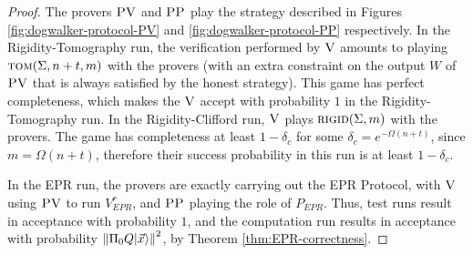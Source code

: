 \begin{proof}
The provers $\textsc{PV}$ and $\textsc{PP}$ play the strategy described in Figures
  \ref{fig:dogwalker-protocol-PV} and \ref{fig:dogwalker-protocol-PP}
  respectively. In the Rigidity-Tomography run, the verification performed by
  $\textsc{V}$ amounts to playing $\textsc{tom}(\Sigma,n+t,m)$ with the provers (with an extra
  constraint on the output $W$ of $\textsc{PV}$ that is always satisfied by the honest
  strategy). This game has perfect
  completeness, which makes the $\textsc{V}$
  accept with probability $1$ in the Rigidity-Tomography run.
  In the Rigidity-Clifford run, $\textsc{V}$ plays $\textsc{rigid}(\Sigma,m)$
  with the provers. The game
  has completeness at least $1-\delta_c$ for some $\delta_c=e^{-\Omega(n+t)}$,
  since $m=\Omega(n+t)$, therefore their success probability in this run is
  at least $1-\delta_c$.

In the EPR run, the provers are exactly carrying out the EPR Protocol, with $\textsc{V}$ using $\textsc{PV}$ to run $V_{EPR}^r$, and $\textsc{PP}$ playing the role of $P_{EPR}$. Thus, test runs result in acceptance with probability $1$, and the computation run results in acceptance with probability $\left\|\Pi_0 Q|\vec{x}\rangle\right\|^2$, by Theorem \ref{thm:EPR-correctness}. 
\end{proof}

\clearpage





